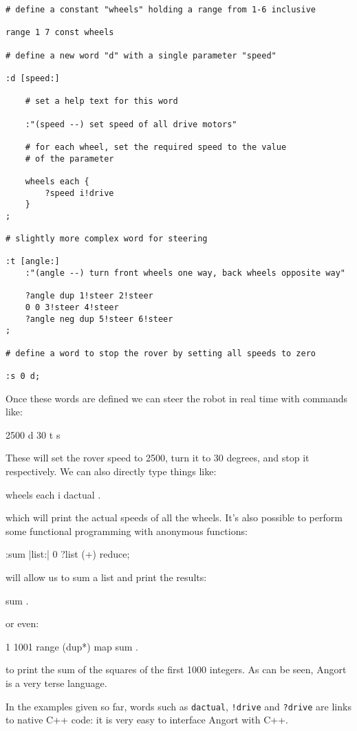 \begin{lstlisting}
# define a constant "wheels" holding a range from 1-6 inclusive

range 1 7 const wheels

# define a new word "d" with a single parameter "speed"

:d [speed:]

    # set a help text for this word

    :"(speed --) set speed of all drive motors"
    
    # for each wheel, set the required speed to the value
    # of the parameter
    
    wheels each {
        ?speed i!drive
    }
;

# slightly more complex word for steering

:t [angle:]
    :"(angle --) turn front wheels one way, back wheels opposite way"
    
    ?angle dup 1!steer 2!steer
    0 0 3!steer 4!steer
    ?angle neg dup 5!steer 6!steer
;

# define a word to stop the rover by setting all speeds to zero

:s 0 d;

\end{lstlisting}
Once these words are defined we can steer the robot in real time with
commands like:
\begin{v}
2500 d
30 t
s
\end{v}
These will set the rover speed to 2500, turn it to 30 degrees, and stop
it respectively. We can also directly type things like:
\begin{v}
wheels each { i dactual .}
\end{v}
which will print the actual speeds of all the wheels.
It's also possible to perform some functional programming with
anonymous functions:
\begin{v}
:sum |list:| 0 ?list (+) reduce;
\end{v}
will allow us to sum a list and print the results:
\begin{v}
[1,2,3,4,5] sum .
\end{v}
or even:
\begin{v}
1 1001 range (dup*) map sum .
\end{v}
to print the sum of the squares of the first 1000 integers.
As can be seen, Angort is a very terse language.

In the examples given so far, words such as \texttt{dactual},
\texttt{!drive} and \texttt{?drive} are links to native C++ code: it
is very easy to interface Angort with C++.

